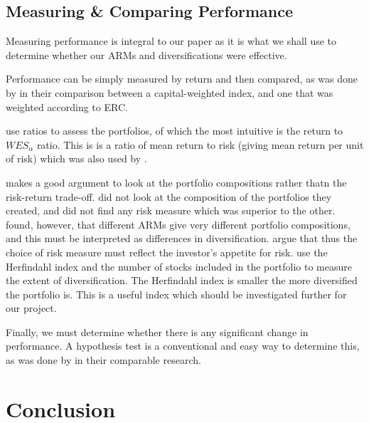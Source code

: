 \documentclass[12pt,a4paper]{article}
\begin{document}
\subsection{Measuring \& Comparing Performance}
\label{subsec:Performance}

Measuring performance is integral to our paper as it is what we shall use to determine whether our ARMs and diversifications were effective. 

Performance can be simply measured by return and then compared, as was done by \cite{bruder2012managing} in their comparison between a capital-weighted index, and one that was weighted according to ERC.

\cite{CHEN20111777} use ratios to assess the portfolios, of which the most intuitive is the  return to $WES_{\alpha}$ ratio. This is is a ratio of mean return to risk (giving mean return per unit of risk) which was also used by \cite{hoe2010empirical}. 

\cite{byrne2004different} makes a good argument to look at the portfolio compositions rather thatn the risk-return trade-off.  \cite{righi2017simulation} did not look at the composition of the portfolios they created, and did not find any risk measure which was superior to the other. \cite{byrne2004different} found, however, that different ARMs give very different portfolio compositions, and this must be interpreted as differences in diversification. \cite{byrne2004different} argue that thus the choice of risk measure must reflect the investor's appetite for risk. \cite{CHEN20111777} use the Herfindahl index and the number of stocks included in the portfolio to measure the extent of diversification. The Herfindahl index is smaller the more diversified the portfolio is. This is a useful index which should be investigated further for our project. 

Finally, we must determine whether there is any significant change in performance. A hypothesis test is a conventional and easy way to determine this, as was done by \cite{righi2017simulation} in their comparable research.

\section{Conclusion}
\label{sec:Concl}


\newpage


\label{bib:bibliography}
 
\end{document}
